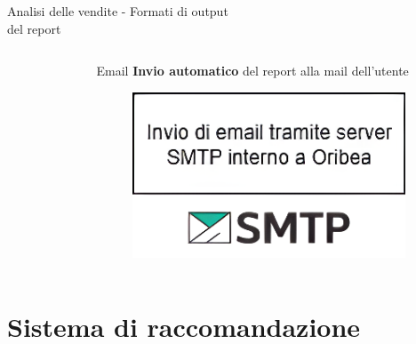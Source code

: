 \documentclass{beamer}
\begin{document}
\begin{frame}{Analisi delle vendite - Formati di output\\ del report}
\begin{columns}
\begin{column}{0.33\textwidth}
\begin{figure}
				\end{figure}
			\end{column}
			\begin{column}{0.33\textwidth}
				\begin{block}{Email}
					\textbf{Invio automatico} del report alla mail dell'utente
				\end{block}
				\begin{figure}
					\centering
					\includegraphics[width=0.95\textwidth]{Diagramma invio report via mail SMTP.png}
				\end{figure}
			\end{column}
		\end{columns}
	\end{frame}


	\section{Sistema di raccomandazione}
\end{document}
